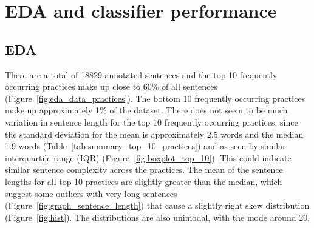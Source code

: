 
\chapter{EDA and classifier performance} %

\label{chapter3} %

\section{EDA}
There are a total of 18829 annotated sentences and the top 10 frequently occurring practices make up close to 60\% of all sentences (Figure~\ref{fig:eda_data_practices}). The bottom 10 frequently occurring practices make up approximately 1\% of the dataset. There does not seem to be much variation in sentence length for the top 10 frequently occurring practices, since the standard deviation for the mean is approximately 2.5 words and the median 1.9 words (Table~\ref{tab:summary_top_10_practices}) and as seen by similar interquartile range (IQR) (Figure~\ref{fig:boxplot_top_10}). This could indicate similar sentence complexity across the practices. The mean of the sentence lengths for all top 10 practices are slightly greater than the median, which suggest some outliers with very long sentences (Figure~\ref{fig:graph_sentence_length}) that cause a slightly right skew distribution (Figure~\ref{fig:hist}). The distributions are also unimodal, with the mode around 20.

